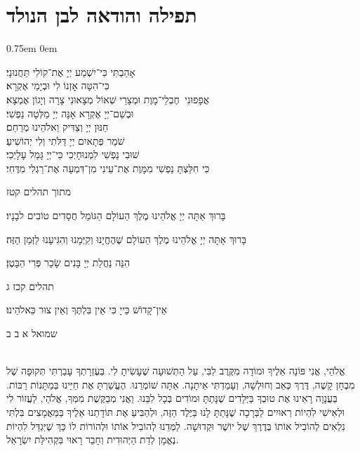 \documentclass[14pt, article, extrafontsizes, twopage, a4paper]{memoir}
\newcommand{\attr}[1]{
{\raggedright\smaller#1}
}
\begin{document}
\pagebreak
\chapter{תפילה והודאה לבן הנולד}
\parskip 0.75em
\parindent 0em


אָהַבְתִּי כִּי־יִשְׁמַע יְיָ אֶת־קוֹלִי תַּחֲנוּנָי׃\\
כִּי־הִטָּה אׇזְנוֹ לִי וּבְיָמַי אֶקְרָא׃\\
אֲפָפוּנִי  חֶבְלֵי־מָוֶת וּמְצָרֵי שְׁאוֹל מְצָאוּנִי צָרָה וְיָגוֹן אֶמְצָא׃\\
וּבְשֵׁם־יְיָ אֶקְרָא אָנָּה יְיָ מַלְּטָה נַפְשִׁי׃\\
חַנּוּן יְיָ וְצַדִּיק וֵאלֹהֵינוּ מְרַחֵם׃\\
שֹׁמֵר פְּתָאיִם יְיָ דַּלֹּתִי וְלִי יְהוֹשִׁיעַ׃\\
שׁוּבִי נַפְשִׁי לִמְנוּחָיְכִי כִּי־יְיָ גָּמַל עָלָיְכִי׃\\
כִּי חִלַּצְתָּ נַפְשִׁי מִמָּוֶת אֶת־עֵינִי מִן־דִּמְעָה אֶת־רַגְלִי מִדֶּחִי׃
\attr{מתוך תהלים קטז}

בָּרוּךְ אַתָּה יְיָ אֱלֹהֵינוּ מֶלֶךְ הַעוֹלָם הַגּוֹמֵל חֲסָדִים טוֹבִים לבָנָיו׃

בָּרוּךְ אַתָּה יְיָ אֱלֹהֵינוּ מֶלֶךְ הַעוֹלָם שֶׁהֶחֱיָנוּ וְקִיְּמָנוּ וְהִגִּיעָנוּ לַזְּמַן הַזֶּה׃

הִנֵּה נַחֲלַת יְיָ בָּנִים שָׂכָר פְּרִי הַבָּטֶן׃
\attr{תהלים קכז ג}

אֵין־קָדוֹשׁ כַּייָ כִּי אֵין בִּלְתֶּךָ וְאֵין צוּר כֵּאלֹהֵינוּ׃
\attr{שמואל א ב ב}

\\
אֱלֹהַי,
אֲנִי פּוֹנָה אֵלֶיךָ וּמוֹדָה מִקֶּרֶב לִבִּי,
עַל הַתְּשׁוּעָה שֶׁעָשִׂיתָ לִי.
בְּעֶזְרָתְךָ עָבַרְתִּי תְּקוּפָה שֶׁל מִבְחָן קָשֶׁה,
דֶּרֶךְ כְּאֵב וְחוּלְשָׁה, וְעָמַדְתִּי אֵיתָנָה.
אַתָּה שׁוֹמְרֵנוּ.
הֶעֱשַׁרְתָּ אֶת חַיֵּינוּ בְּמַתָּנוֹת רַבּוֹת.
בַּעֲנָוָה רָאִינוּ אֶת טוּבְךָ בַּיְּלָדִים שֶׁנָּתַתָּ
וּמוֹדִים בְּכָל לִבֵּנוּ.
וַאֲנִי מְבַקֶּשֶׁת מִמְּךָ, אֱלֹהַי,
לַעֲזוֹר לִי וּלְאִישִׁי
לִהְיוֹת רְאוּיִים לַבְּרָכָה
שֶׁנָּתַתָּ לָנוּ בַּיֶּלֶד הַזֶּה,
וּלְהַבִּיעַ אֶת תּוֹדָתֵנוּ אֵלֶיךָ
בַּמַּאֲמָצִים בִּלְתִּי נִלְאִים לְהוֹבִיל אוֹתוֹ
בְּדֶרֶךְ שֶׁל יוֹשֶׁר וּקְדוּשָׁה.
לַמְּדֵנוּ לְהוֹבִיל אוֹתוֹ וּלְהוֹרוֹת לוֹ
כַּךְ שֶׁיִּגְדַּל לִהְיוֹת נֶאֱמָן לְדַת הַיְּהוּדִית 
וְחָבֵר רָאוּי בִּקְהִילַּת יִשְׂרָאֵל.
\end{document}
